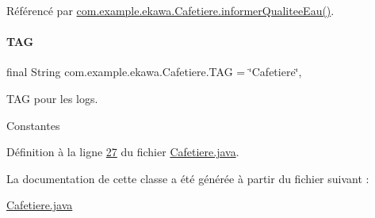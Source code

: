 Référencé par \hyperlink{_cafetiere_8java_source_l00388}{com.\+example.\+ekawa.\+Cafetiere.\+informer\+Qualitee\+Eau()}.

\mbox{\label{classcom_1_1example_1_1ekawa_1_1_cafetiere_aa0c1fd99a2508b06c462aea17034aa91}} 
\paragraph{\texorpdfstring{T\+AG}{TAG}}
{\footnotesize\ttfamily final String com.\+example.\+ekawa.\+Cafetiere.\+T\+AG = \char`\"{}Cafetiere\char`\"{}\hspace{0.3cm}{\ttfamily [static]}, {\ttfamily [private]}}



T\+AG pour les logs. 

Constantes 

Définition à la ligne \hyperlink{_cafetiere_8java_source_l00027}{27} du fichier \hyperlink{_cafetiere_8java_source}{Cafetiere.\+java}.



La documentation de cette classe a été générée à partir du fichier suivant \+:\begin{DoxyCompactItemize}
\item 
\hyperlink{_cafetiere_8java}{Cafetiere.\+java}\end{DoxyCompactItemize}
